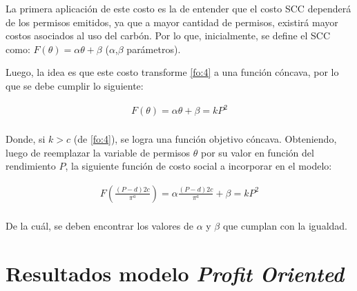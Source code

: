 La primera aplicación de este costo es la de entender que el costo SCC dependerá de los permisos emitidos, ya que a mayor cantidad de permisos, existirá mayor costos asociados al uso del carbón. Por lo que, inicialmente, se  define el SCC como: $F(\theta)= \alpha\theta + \beta$ ($\alpha$,$\beta$ parámetros). 
\vspace{2.5mm}

Luego, la idea es que este costo transforme \ref{fo:4} a una función cóncava, por lo que se debe cumplir lo siguiente:

\begin{equation}
\begin{array}{rrclcl}
    F(\theta)= \alpha\theta + \beta = kP^2 \label{fo:5}\\
\end{array}
\end{equation}

Donde, si $k>c$ (de \ref{fo:4}), se logra una función objetivo cóncava. Obteniendo, luego de reemplazar la variable de permisos $\theta$ por su valor en función del rendimiento $P$, la siguiente función de costo social a incorporar en el modelo:

\begin{equation}
\begin{array}{rrclcl}
    F(\frac{(P-d)2c}{\pi^a})= \alpha\frac{(P-d)2c}{\pi^a} + \beta = kP^2 \\
\end{array}
\end{equation}

De la cuál, se deben encontrar los valores de $\alpha$ y $\beta$ que cumplan con la igualdad.




\section{Resultados modelo \textit{Profit Oriented}} \label{anexoPO}


